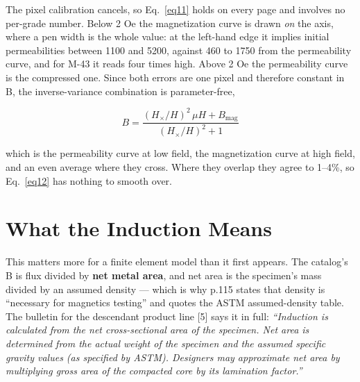 \documentclass[
  11pt,
]{article}
\begin{document}
The pixel calibration cancels, so Eq.~\eqref{eq11} holds on every page and involves no per-grade number. Below 2 Oe the magnetization curve is drawn \emph{on} the axis, where a pen width is the whole value: at the left-hand edge it implies initial permeabilities between 1100 and 5200, against 460 to 1750 from the permeability curve, and for M-43 it reads four times high. Above 2 Oe the permeability curve is the compressed one. Since both errors are one pixel and therefore constant in B, the inverse-variance combination is parameter-free,

\begin{equation}\label{eq12}
B = \frac{(H_\times/H)^{2}\,\mu H + B_{\text{mag}}}{(H_\times/H)^{2} + 1}
\end{equation}

which is the permeability curve at low field, the magnetization curve at high field, and an even average where they cross. Where they overlap they agree to 1--4\%, so Eq.~\eqref{eq12} has nothing to smooth over.

\section{What the Induction Means}\label{what-the-induction-means}

This matters more for a finite element model than it first appears. The catalog's B is flux divided by \textbf{net metal area}, and net area is the specimen's mass divided by an assumed density --- which is why p.115 states that density is ``necessary for magnetics testing'' and quotes the ASTM assumed-density table. The bulletin for the descendant product line {[}5{]} says it in full: \emph{``Induction is calculated from the net cross-sectional area of the specimen. Net area is determined from the actual weight of the specimen and the assumed specific gravity values (as specified by ASTM). Designers may approximate net area by multiplying gross area of the compacted core by its lamination factor.''}
\end{document}
